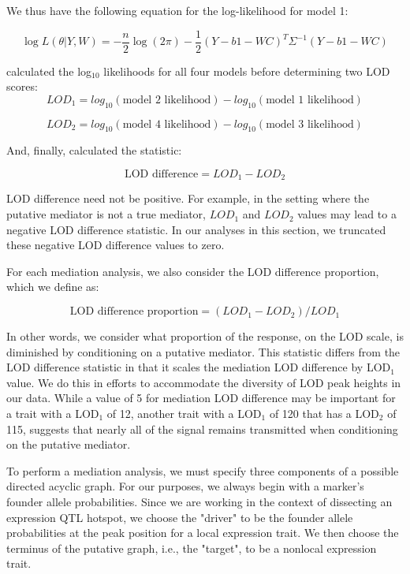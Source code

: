 \documentclass{article}
\begin{document}
We thus have the following equation for the log-likelihood for model 1:

\begin{equation}
    \log L(\theta | Y, W) = - \frac{n}{2}\log (2\pi) - \frac{1}{2} (Y - b1 - WC)^T\Sigma^{-1}(Y - b1 - WC)
\end{equation}


\citet{keller2018genetic} calculated the log$_{10}$ likelihoods for all four models before determining two LOD scores: 
\begin{equation}
LOD_1 = log_{10}(\text{model 2 likelihood}) - log_{10}(\text{model 1 likelihood})
\end{equation}

\begin{equation}
LOD_2 = log_{10}(\text{model 4 likelihood}) - log_{10}(\text{model 3 likelihood})
\end{equation}

And, finally, \citet{keller2018genetic} calculated the statistic:

\begin{equation}
\text{LOD difference} = LOD_1 - LOD_2
\end{equation}

LOD difference need not be positive. For example, in the setting where the putative mediator is not a true mediator, $LOD_1$ and $LOD_2$ values may lead to a negative LOD difference statistic. In our analyses in this section, we truncated these negative LOD difference values to zero. 

For each mediation analysis, we also consider the LOD difference proportion, which we define as:

\begin{equation}
\text{LOD difference proportion} = (LOD_1 - LOD_2) / LOD_1
\end{equation}

In other words, we consider what proportion of the response, on the LOD scale, is diminished by conditioning on a putative mediator. This statistic differs from the LOD difference statistic in that it scales the mediation LOD difference by LOD$_1$ value. We do this in efforts to accommodate the diversity of LOD peak heights in our data. While a value of 5 for mediation LOD difference may be important for a trait with a LOD$_1$ of 12, another trait with a LOD$_1$ of 120 that has a LOD$_2$ of 115, suggests that nearly all of the signal remains transmitted when conditioning on the putative mediator.

To perform a mediation analysis, we must specify three components of a possible directed acyclic graph. For our purposes, we always begin with a marker's founder allele probabilities. Since we are working in the context of dissecting an expression QTL hotspot, we choose the "driver" to be the founder allele probabilities at the peak position for a local expression trait. We then choose the terminus of the putative graph, i.e., the "target", to be a nonlocal expression trait. 
\end{document}
